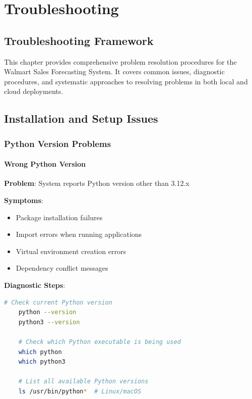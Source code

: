 %
%
%



\chapter{Troubleshooting}

\section{Troubleshooting Framework}

This chapter provides comprehensive problem resolution procedures for the Walmart Sales Forecasting System. It covers common issues, diagnostic procedures, and systematic approaches to resolving problems in both local and cloud deployments.



\section{Installation and Setup Issues}

\subsection{Python Version Problems}

\subsubsection{Wrong Python Version}

\textbf{Problem}: System reports Python version other than 3.12.x

\textbf{Symptoms}:
\begin{itemize}
	\item Package installation failures
	\item Import errors when running applications
	\item Virtual environment creation errors
	\item Dependency conflict messages
\end{itemize}

\textbf{Diagnostic Steps}:
\begin{lstlisting}[language=bash,basicstyle=\color{blue}]
	# Check current Python version
	python --version
	python3 --version
	
	# Check which Python executable is being used
	which python
	which python3
	
	# List all available Python versions
	ls /usr/bin/python*  # Linux/macOS
\end{lstlisting}

